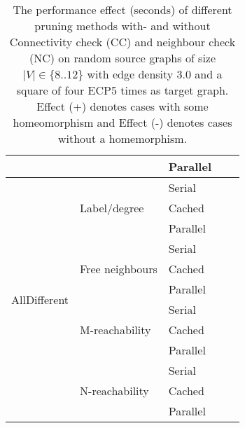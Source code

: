 \begin{table}[]
\begin{tabular}{|l|l|l|l|l|}
                               &                                  & Parallel             &                     &                     \\ \hline
\multirow{12}{*}{AllDifferent} & \multirow{3}{*}{Label/degree}    & Serial               &                     &                     \\ \cline{3-5} 
                               &                                  & Cached               &                     &                     \\ \cline{3-5} 
                               &                                  & Parallel             &                     &                     \\ \cline{2-5} 
                               & \multirow{3}{*}{Free neighbours} & Serial               &                     &                     \\ \cline{3-5} 
                               &                                  & Cached               &                     &                     \\ \cline{3-5} 
                               &                                  & Parallel             &                     &                     \\ \cline{2-5} 
                               & \multirow{3}{*}{M-reachability}  & Serial               &                     &                     \\ \cline{3-5} 
                               &                                  & Cached               &                     &                     \\ \cline{3-5} 
                               &                                  & Parallel             &                     &                     \\ \cline{2-5} 
                               & \multirow{3}{*}{N-reachability}  & Serial               &                     &                     \\ \cline{3-5} 
                               &                                  & Cached               &                     &                     \\ \cline{3-5} 
                               &                                  & Parallel             &                     &                     \\ \hline
\end{tabular}
\caption{The performance effect (seconds) of different pruning methods with- and without Connectivity check (CC) and neighbour check (NC) on random source graphs of size $|V|\in \{8..12\}$ with edge density 3.0 and a square of four ECP5 times as target graph. Effect (+) denotes cases with some homeomorphism and Effect (-) denotes cases without a homemorphism.}
\label{tab:pruning-performance-big}
\end{table}
